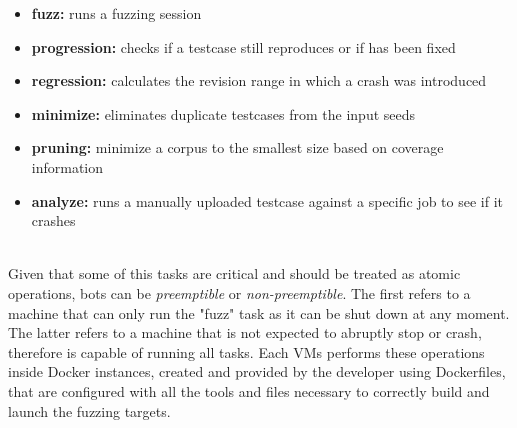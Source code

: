 \begin{itemize}
    \item \textbf{fuzz:} runs a fuzzing session
    \item \textbf{progression:} checks if a testcase still reproduces or if has been fixed
    \item \textbf{regression:} calculates the revision range in which a crash was introduced
    \item \textbf{minimize:} eliminates duplicate testcases from the input seeds
    \item \textbf{pruning:} minimize a corpus to the smallest size based on coverage information
    \item \textbf{analyze:} runs a manually uploaded testcase against a specific job to see if it crashes
\end{itemize}
\ \\
Given that some of this tasks are critical and should be treated as atomic operations, bots can be \textit{preemptible} or \textit{non-preemptible}.
\newline
The first refers to a machine that can only run the "fuzz" task as it can be shut down at any moment.
\newline
The latter refers to a machine that is not expected to abruptly stop or crash, therefore is capable of running all tasks.
\newline \newline \newline
Each VMs performs these operations inside Docker instances, created and provided by the developer using Dockerfiles, that are configured with all the tools and files necessary to correctly build and launch the fuzzing targets.


\ \\
